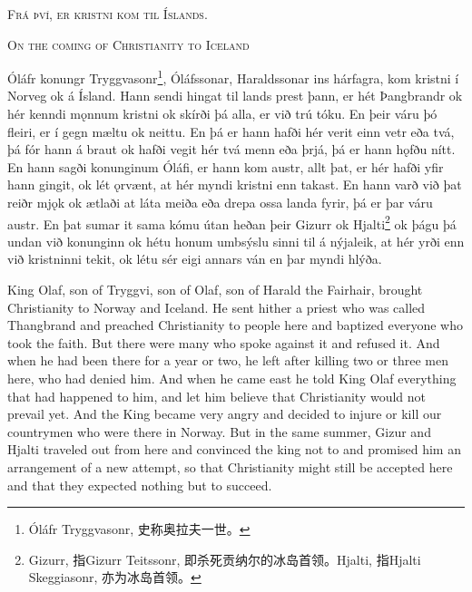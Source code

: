\begin{paracol}{2}
    \begin{center}
        \textsc{Frá því, er kristni kom til Íslands.}
    \end{center}

    \switchcolumn

    \begin{center}
        \textsc{On the coming of Christianity to Iceland}
    \end{center}

    \switchcolumn*

    Óláfr konungr Tryggvasonr\footnote{Óláfr Tryggvasonr, 史称奥拉夫一世。}, Óláfssonar, Haraldssonar ins hárfagra, kom kristni í Norveg ok á Ísland. Hann sendi hingat til lands prest þann, er hét Þangbrandr ok hér kenndi mǫnnum kristni ok skírði þá alla, er við trú tóku. En þeir váru þó fleiri, er í gegn mæltu ok neittu. En þá er hann hafði hér verit einn vetr eða tvá, þá fór hann á braut ok hafði vegit hér tvá menn eða þrjá, þá er hann hǫfðu nítt. En hann sagði konunginum Óláfi, er hann kom austr, allt þat, er hér hafði yfir hann gingit, ok lét ǫrvænt, at hér myndi kristni enn takast. En hann varð við þat reiðr mjǫk ok ætlaði at láta meiða eða drepa ossa landa fyrir, þá er þar váru austr. En þat sumar it sama kómu útan heðan þeir Gizurr ok Hjalti\footnote{Gizurr, 指Gizurr Teitssonr, 即杀死贡纳尔的冰岛首领。Hjalti, 指Hjalti Skeggiasonr, 亦为冰岛首领。} ok þágu þá undan við konunginn ok hétu honum umbsýslu sinni til á nýjaleik, at hér yrði enn við kristninni tekit, ok létu sér eigi annars ván en þar myndi hlýða.

    \switchcolumn

    King Olaf, son of Tryggvi, son of Olaf, son of Harald the Fairhair, brought Christianity to Norway and Iceland. He sent hither a priest who was called Thangbrand and preached Christianity to people here and baptized everyone who took the faith. But there were many who spoke against it and refused it. And when he had been there for a year or two, he left after killing two or three men here, who had denied him. And when he came east he told King Olaf everything that had happened to him, and let him believe that Christianity would not prevail yet. And the King became very angry and decided to injure or kill our countrymen who were there in Norway. But in the same summer, Gizur and Hjalti traveled out from here and convinced the king not to and promised him an arrangement of a new attempt, so that Christianity might still be accepted here and that they expected nothing but to succeed.
\end{paracol}
